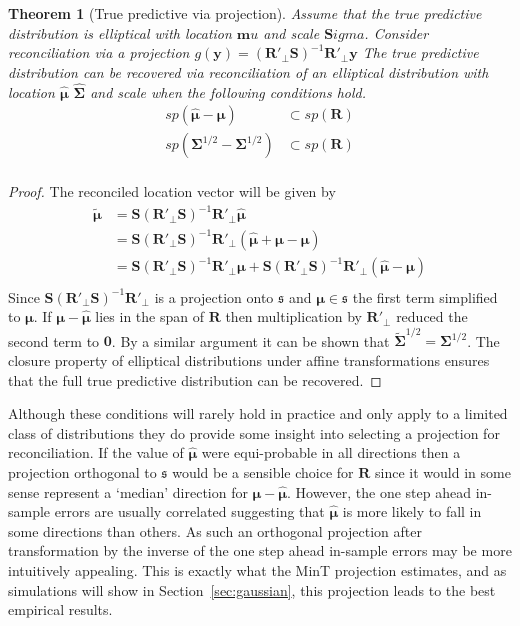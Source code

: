 \documentclass[a4paper, 11pt]{article}
\theoremstyle{theo}
\newtheorem{theo}{Theorem}[section]
\theoremstyle{definition}
\begin{document}
\begin{theo}[True predictive via projection]
	Assume that the true predictive distribution is elliptical with location ${\bm mu}$ and scale ${\bm Sigma}$.  Consider reconciliation via a projection $g({\bm y})=({\bm R}'_{\perp}{\bm S})^{-1}{\bm R}'_{\perp}{\bm y}$
	The true predictive distribution can be recovered via reconciliation of an elliptical distribution with location $\hat{\bm \mu}$ $\hat{\bm \Sigma}$ and scale when the following conditions hold.
	\begin{align}
	sp(\hat{\bm\mu}-{\bm \mu})&\subset sp(\bm{R})\\
    sp(\bm{\Sigma}^{1/2}-{\bm \Sigma}^{1/2})&\subset sp({\bm R})\\
	\end{align}
\end{theo}
\begin{proof}
	The reconciled location vector will be given by
	\begin{align*}
		\tilde{\bm \mu}&={\bm S}({\bm R}'_{\perp}{\bm S})^{-1}{\bm R}'_{\perp}\hat{\bm \mu}\\
		&={\bm S}({\bm R}'_{\perp}{\bm S})^{-1}{\bm R}'_{\perp}\left(\hat{\bm \mu}+{\bm \mu}-{\bm \mu}\right)\\
		&={\bm S}({\bm R}'_{\perp}{\bm S})^{-1}{\bm R}'_{\perp}{\bm \mu}+{\bm S}({\bm R}'_{\perp}{\bm S})^{-1}{\bm R}'_{\perp}\left(\hat{\bm \mu}-{\bm \mu}\right)\\
	\end{align*}
  Since ${\bm S}({\bm R}'_{\perp}{\bm S})^{-1}{\bm R}'_{\perp}$ is a projection onto $\mathfrak{s}$ and ${\bm \mu}\in\mathfrak{s}$ the first term simplified to ${\bm \mu}$.  If ${\bm \mu}-\hat{\bm \mu}$ lies in the span of ${\bm R}$ then multiplication by ${\bm R}'_{\perp}$ reduced the second term to ${\bm 0}$.  By a similar argument it can be shown that $\tilde{\bm \Sigma}^{1/2}={\bm \Sigma}^{1/2}$.  The closure property of elliptical distributions under affine transformations ensures that the full true predictive distribution can be recovered.
\end{proof}  
Although these conditions will rarely hold in practice and only apply to a limited class of distributions they do provide some insight into selecting a projection for reconciliation.  If the value of $\hat{\bm \mu}$ were equi-probable in all directions then a projection orthogonal to $\mathfrak{s}$ would be a sensible choice for ${\bm R}$ since it would in some sense represent a `median' direction for ${\bm \mu}-\hat{\bm \mu}$.  However, the one step ahead in-sample errors are usually correlated suggesting that $\hat{\bm \mu}$ is more likely to fall in some directions than others.  As such an orthogonal projection after transformation by the inverse of the one step ahead in-sample errors may be more intuitively appealing.  This is exactly what the MinT projection estimates, and as simulations will show in Section~\ref{sec:gaussian}, this projection leads to the best empirical results.
\end{document}
